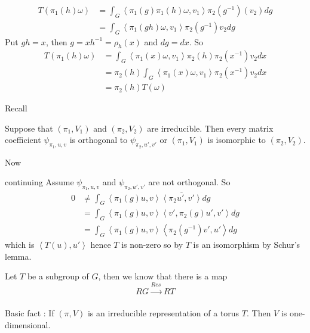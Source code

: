 \documentclass[11pt,a4paper]{scrarticle}
\theoremstyle{definition}
\renewenvironment{proof}[1][\proofname]{\vspace{-10pt}\begin{myproof}}{\end{myproof}}
\theoremstyle{greenbox}
\begin{document}
 \begin{proof}
    \begin{align*}
        T(\pi_{1}(h)\omega) & = \int_{G} \left< \pi_{1}(g)\pi_{1}(h) \omega, v_{1}  \right> \pi_{2}(g^{-1})(v_{2}) dg \\
        & = \int_{G} \left< \pi_{1}(gh)\omega, v_{1} \right>\pi_{2}(g^{-1})v_{2} dg 
    \end{align*}
    Put $ gh=x $, then $ g = x h^{-1} = \rho_{h}(x) $ and $ dg = dx $. So \begin{align*}
        T(\pi_{1}(h)\omega) & = \int_{G}\left< \pi_{1}(x)\omega, v_{1}  \right> \pi_{2}(h)\pi_{2}(x^{-1})v_{2}dx \\
        & = \pi_{2}(h) \int_{G}\left< \pi_{1}(x) \omega, v_{1} \right> \pi_{2}(x^{-1})v_{2} dx \\
        & = \pi_{2}(h)T(\omega)
    \end{align*}
 \end{proof}
Recall
 \begin{lemma}
    Suppose that $ (\pi_{1},V_{1}) $ and $ (\pi_{2},V_{2}) $ are irreducible. Then every matrix coefficient $ \psi_{\pi_{1},u,v} $ is orthogonal to $ \psi_{\pi_{2},u',v'} $ or $ (\pi_{1},V_{1}) $ is isomorphic to $ (\pi_{2},V_{2}) $. 
 \end{lemma}

 Now 
 \begin{proof}{continuing}
    Assume $ \psi_{\pi_{1},u,v} $ and $ \psi_{\pi_{2},u',v'} $ are not orthogonal. So \begin{align*}
        0  & \neq \int_{G}\left< \pi_{1}(g)u,v \right> \overline{\left< \pi_{2}u',v' \right>}dg \\
        & = \int_{G} \left< \pi_{1}(g)u,v \right> \left< v',\pi_{2}(g)u',v' \right>dg \\
        & = \int_{G}\left< \pi_{1}(g)u,v \right> \left< \pi_{2}(g^{-1})v',u' \right>dg 
    \end{align*}
    which is $ \left< T(u),u' \right> $ hence $ T $ is non-zero so by $ T $ is an isomorphism by Schur's lemma. 
 \end{proof}

 Let $ T $ be a subgroup of $ G $, then we know that there is a map 
 \[ RG \xrightarrow[]{Res_{}^{}}RT \]

 Basic fact : If $ (\pi,V) $ is an irreducible representation of a torus $ T $. Then $ V $ is one-dimensional. 
\end{document}
